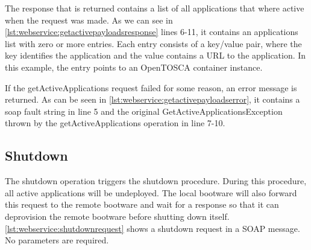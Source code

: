 The response that is returned contains a list of all applications that where active when the request was made.
As we can see in \autoref{lst:webservice:getactivepayloadsresponse} lines 6-11, it contains an applications list with zero or more entries.
Each entry consists of a key/value pair, where the key identifies the application and the value contains a URL to the application.
In this example, the entry points to an OpenTOSCA container instance.

\vspace*{\baselineskip}

If the getActiveApplications request failed for some reason, an error message is returned.
As can be seen in \autoref{lst:webservice:getactivepayloadserror}, it contains a soap fault string in line 5 and the original GetActiveApplicationsException thrown by the getActiveApplications operation in line 7-10.

\vspace*{\baselineskip}

\subsection{Shutdown}

The shutdown operation triggers the shutdown procedure.
During this procedure, all active applications will be undeployed.
The local bootware will also forward this request to the remote bootware and wait for a response so that it can deprovision the remote bootware before shutting down itself.
\autoref{lst:webservice:shutdownrequest} shows a shutdown request in a SOAP message.
No parameters are required.

